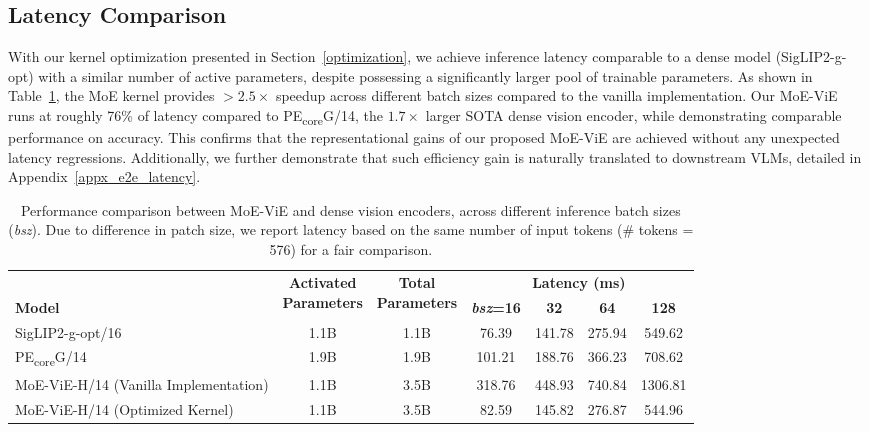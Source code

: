 \documentclass[runningheads]{llncs}
\begin{document}
\subsection{Latency Comparison}
With our kernel optimization presented in Section~\ref{optimization}, we achieve inference latency comparable to a dense model (SigLIP2-g-opt) with a similar number of active parameters, despite possessing a significantly larger pool of trainable parameters. As shown in Table~\ref{tab:performance_results}, the MoE kernel provides $>2.5\times$ speedup across different batch sizes compared to the vanilla implementation. Our MoE-ViE runs at roughly 76\% of latency compared to PE\textsubscript{core}G/14, the $1.7\times$ larger SOTA dense vision encoder, while demonstrating comparable performance on accuracy. This confirms that the representational gains of our proposed MoE-ViE are achieved without any unexpected latency regressions. Additionally, we further demonstrate that such efficiency gain is naturally translated to downstream VLMs, detailed in Appendix~\ref{appx_e2e_latency}.

\begin{table}[h]
\centering
\caption{Performance comparison between MoE-ViE and dense vision encoders, across different inference batch sizes (\textit{bsz}). Due to difference in patch size, we report latency based on the same number of input tokens (\# tokens = 576) for a fair comparison. } %
\label{tab:performance_results}
\fontsize{6.5}{8}\selectfont
\begin{tabular}{l c c c c c c}
\toprule
\textbf{} & \multirow{2}{*}{\parbox{1.5cm}{\centering \textbf{Activated\\Parameters}}} & \multirow{2}{*}{\parbox{1.5cm}{\centering \textbf{Total\\Parameters}}} & \multicolumn{4}{c}{\textbf{Latency (ms)}} \\
\cmidrule(lr){4-7}
\textbf{Model} & & & \textbf{\textit{bsz}=16} & \textbf{32} & \textbf{64} & \textbf{128} \\
\midrule
SigLIP2-g-opt/16 \cite{siglip2} & 1.1B & 1.1B & 76.39 & 141.78 & 275.94 & 549.62  \\
PE\textsubscript{core}G/14 \cite{pe} & 1.9B & 1.9B & 101.21 & 188.76 & 366.23 & 708.62 \\
\midrule
MoE-ViE-H/14 (Vanilla Implementation) & 1.1B & 3.5B & 318.76  & 448.93 & 740.84 & 1306.81  \\
MoE-ViE-H/14 (Optimized Kernel) & 1.1B & 3.5B & 82.59  & 145.82 & 276.87 & 544.96  \\
\bottomrule
\end{tabular}
\end{table}
\end{document}
